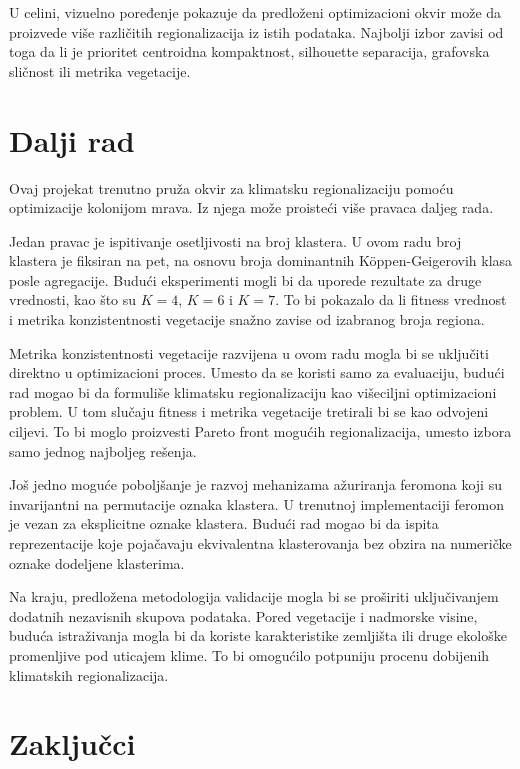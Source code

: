 \documentclass[11pt]{article}
\begin{document}
U celini, vizuelno poređenje pokazuje da predloženi optimizacioni okvir može da proizvede više različitih regionalizacija iz istih podataka. Najbolji izbor zavisi od toga da li je prioritet centroidna kompaktnost, silhouette separacija, grafovska sličnost ili metrika vegetacije.

\section{Dalji rad}
\label{sec:future}

Ovaj projekat trenutno pruža okvir za klimatsku regionalizaciju pomoću optimizacije kolonijom mrava. Iz njega može proisteći više pravaca daljeg rada.

Jedan pravac je ispitivanje osetljivosti na broj klastera. U ovom radu broj klastera je fiksiran na pet, na osnovu broja dominantnih Köppen-Geigerovih klasa posle agregacije. Budući eksperimenti mogli bi da uporede rezultate za druge vrednosti, kao što su $K=4$, $K=6$ i $K=7$. To bi pokazalo da li fitness vrednost i metrika konzistentnosti vegetacije snažno zavise od izabranog broja regiona.

Metrika konzistentnosti vegetacije razvijena u ovom radu mogla bi se uključiti direktno u optimizacioni proces. Umesto da se koristi samo za evaluaciju, budući rad mogao bi da formuliše klimatsku regionalizaciju kao višeciljni optimizacioni problem. U tom slučaju fitness i metrika vegetacije tretirali bi se kao odvojeni ciljevi. To bi moglo proizvesti Pareto front mogućih regionalizacija, umesto izbora samo jednog najboljeg rešenja.

Još jedno moguće poboljšanje je razvoj mehanizama ažuriranja feromona koji su invarijantni na permutacije oznaka klastera. U trenutnoj implementaciji feromon je vezan za eksplicitne oznake klastera. Budući rad mogao bi da ispita reprezentacije koje pojačavaju ekvivalentna klasterovanja bez obzira na numeričke oznake dodeljene klasterima.

Na kraju, predložena metodologija validacije mogla bi se proširiti uključivanjem dodatnih nezavisnih skupova podataka. Pored vegetacije i nadmorske visine, buduća istraživanja mogla bi da koriste karakteristike zemljišta ili druge ekološke promenljive pod uticajem klime. To bi omogućilo potpuniju procenu dobijenih klimatskih regionalizacija.

\section{Zaključci}
\end{document}

